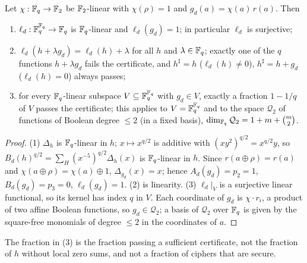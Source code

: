 \begin{theorem}\label{thm:repair}
Let $\chi:\mathbb{F}_q\to\mathbb{F}_2$ be $\mathbb{F}_2$-linear with $\chi(\rho)=1$ and $g_d(a)=\chi(a)\,r(a)$. Then
\begin{enumerate}
\item $\ell_d:\mathbb{F}_q^{\mathbb{F}_q}\to\mathbb{F}_q$ is $\mathbb{F}_q$-linear and $\ell_d(g_d)=1$; in particular $\ell_d$ is surjective;
\item $\ell_d(h+\lambda g_d)=\ell_d(h)+\lambda$ for all $h$ and $\lambda\in\mathbb{F}_q$; exactly one of the $q$ functions
$h+\lambda g_d$ fails the certificate, and $h^\sharp=h$ ($\ell_d(h)\ne0$), $h^\sharp=h+g_d$ ($\ell_d(h)=0$) always passes;
\item for every $\mathbb{F}_q$-linear subspace $V\subseteq\mathbb{F}_q^{\mathbb{F}_q}$ with $g_d\in V$, exactly a fraction $1-1/q$ of $V$
passes the certificate; this applies to $V=\mathbb{F}_q^{\mathbb{F}_q}$ and to the space $\mathcal Q_2$ of functions of Boolean
degree $\le2$ (in a fixed basis), $\dim_{\mathbb{F}_q}\mathcal Q_2=1+m+\binom m2$.
\end{enumerate}
\end{theorem}
\begin{proof}
(1) $\Delta_h$ is $\mathbb{F}_q$-linear in $h$; $x\mapsto x^{q/2}$ is additive with $(xy^2)^{q/2}=x^{q/2}y$, so
$B_d(h)^{q/2}=\sum_H(x^{-5})^{q/2}\Delta_h(x)$ is $\mathbb{F}_q$-linear in $h$. Since $r(a\oplus\rho)=r(a)$ and
$\chi(a\oplus\rho)=\chi(a)\oplus1$, $\Delta_{g_d}(x)=x$; hence $A_d(g_d)=p_2=1$, $B_d(g_d)=p_3=0$, $\ell_d(g_d)=1$.
(2) is linearity. (3) $\ell_d|_V$ is a surjective linear functional, so its kernel has index $q$ in $V$.
Each coordinate of $g_d$ is $\chi\cdot r_i$, a product of two affine Boolean functions, so $g_d\in\mathcal Q_2$; a basis of
$\mathcal Q_2$ over $\mathbb{F}_q$ is given by the square-free monomials of degree $\le2$ in the coordinates of $a$.
\end{proof}
The fraction in (3) is the fraction passing a sufficient certificate, not the fraction of $h$ without local zero
sums, and not a fraction of ciphers that are secure.


